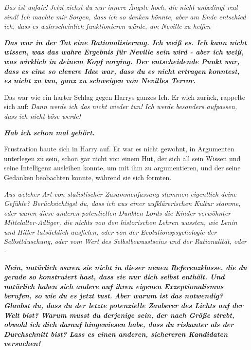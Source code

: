 \emph{Das ist unfair!} \emph{Jetzt ziehst du nur innere Ängste hoch, die nicht
unbedingt real sind! Ich machte mir Sorgen, dass ich so denken könnte, aber am
Ende entschied ich, dass es wahrscheinlich funktionieren würde, um Neville zu
helfen -}

\textbf{\emph{\glqq{}Das war in der Tat eine Rationalisierung. Ich weiß es. Ich
kann nicht wissen, was das wahre Ergebnis für Neville sein wird - aber ich weiß,
was wirklich in deinem Kopf vorging. Der entscheidende Punkt war, dass es eine
so clevere Idee war, dass du es nicht ertragen konntest, es nicht zu tun, ganz
zu schweigen von Nevilles Terror.\grqq{}}}

Das war wie ein harter Schlag gegen Harrys ganzes Ich. Er wich zurück, rappelte
sich auf: \emph{Dann werde ich das nicht wieder tun! Ich werde besonders
aufpassen, dass ich nicht böse werde!}

\textbf{\emph{\glqq{}Hab ich schon mal gehört.\grqq{}}}

Frustration baute sich in Harry auf. Er war es nicht gewohnt, in Argumenten
unterlegen zu sein, schon gar nicht von einem Hut, der sich all sein Wissen und
seine Intelligenz ausleihen konnte, um mit ihm zu argumentieren, und der seine
Gedanken beobachten konnte, während sie sich formten.

\emph{Aus welcher Art von statistischer Zusammenfassung stammen eigentlich deine
\glqq{}Gefühle\grqq{}? Berücksichtigst du, dass ich aus einer aufklärerischen
Kultur stamme, oder waren diese anderen potentiellen Dunklen Lords die Kinder
verwöhnter Mittelalter-Adliger, die nichts von den historischen Lehren wussten,
wie Lenin und Hitler tatsächlich ausfielen, oder von der Evolutionspsychologie
der Selbsttäuschung, oder vom Wert des Selbstbewusstseins und der Rationalität,
oder -}

\textbf{\emph{\glqq{}Nein, natürlich waren sie nicht in dieser neuen
Referenzklasse, die du gerade so konstruiert hast, dass sie nur dich selbst
enthält. Und natürlich haben sich andere auf ihren eigenen Exzeptionalismus
berufen, so wie du es jetzt tust.}} \textbf{\emph{Aber warum ist das notwendig?
Glaubst du, dass du der letzte potenzielle Zauberer des Lichts auf der Welt
bist? Warum musst du derjenige sein, der nach Größe strebt, obwohl ich dich
darauf hingewiesen habe, dass du riskanter als der Durchschnitt bist? Lass es
einen anderen, sichereren Kandidaten versuchen!\grqq{}}}

